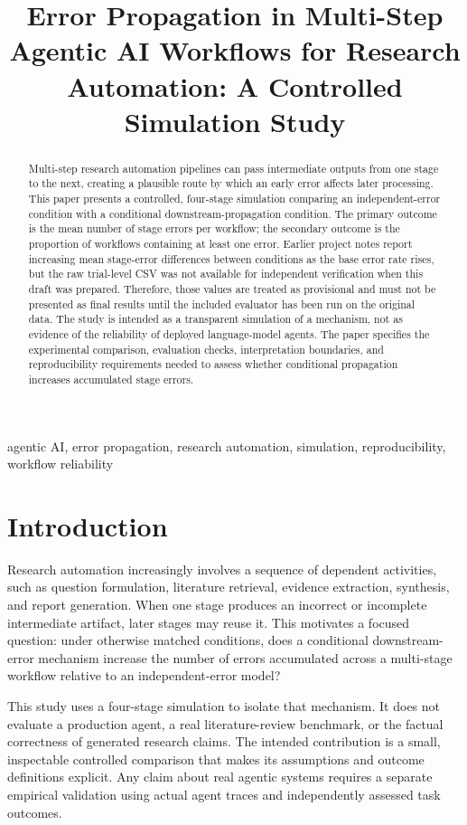 \documentclass[conference]{IEEEtran}
\title{Error Propagation in Multi-Step Agentic AI Workflows for Research Automation: A Controlled Simulation Study}
\author{\IEEEauthorblockN{[AUTHOR NAME]}
\IEEEauthorblockA{[DEPARTMENT / INSTITUTION]\\[EMAIL OR STUDENT ID, IF REQUIRED]}}
\begin{document}
\maketitle

\begin{abstract}
Multi-step research automation pipelines can pass intermediate outputs from one stage to the next, creating a plausible route by which an early error affects later processing. This paper presents a controlled, four-stage simulation comparing an independent-error condition with a conditional downstream-propagation condition. The primary outcome is the mean number of stage errors per workflow; the secondary outcome is the proportion of workflows containing at least one error. Earlier project notes report increasing mean stage-error differences between conditions as the base error rate rises, but the raw trial-level CSV was not available for independent verification when this draft was prepared. Therefore, those values are treated as provisional and must not be presented as final results until the included evaluator has been run on the original data. The study is intended as a transparent simulation of a mechanism, not as evidence of the reliability of deployed language-model agents. The paper specifies the experimental comparison, evaluation checks, interpretation boundaries, and reproducibility requirements needed to assess whether conditional propagation increases accumulated stage errors.
\end{abstract}

\begin{IEEEkeywords}
agentic AI, error propagation, research automation, simulation, reproducibility, workflow reliability
\end{IEEEkeywords}

\section{Introduction}
Research automation increasingly involves a sequence of dependent activities, such as question formulation, literature retrieval, evidence extraction, synthesis, and report generation. When one stage produces an incorrect or incomplete intermediate artifact, later stages may reuse it. This motivates a focused question: under otherwise matched conditions, does a conditional downstream-error mechanism increase the number of errors accumulated across a multi-stage workflow relative to an independent-error model?

This study uses a four-stage simulation to isolate that mechanism. It does not evaluate a production agent, a real literature-review benchmark, or the factual correctness of generated research claims. The intended contribution is a small, inspectable controlled comparison that makes its assumptions and outcome definitions explicit. Any claim about real agentic systems requires a separate empirical validation using actual agent traces and independently assessed task outcomes.
\end{document}

